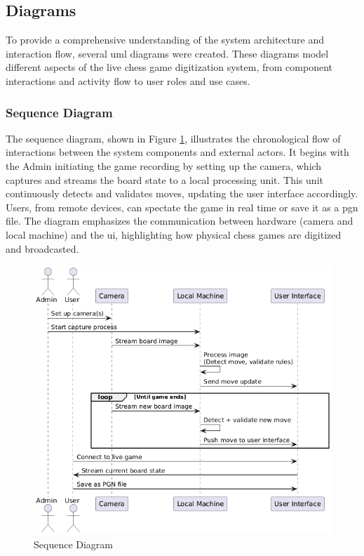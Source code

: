 \subsection{Diagrams}
\label{subsec:diagrams}

To provide a comprehensive understanding of the system architecture and interaction flow, several \gls{uml} diagrams were created. These diagrams model different aspects of the live chess game digitization system, from component interactions and activity flow to user roles and use cases.

\subsubsection*{Sequence Diagram}
\label{subsubsec:sequence-diagram}

The sequence diagram, shown in Figure \ref{fig:sequence}, illustrates the chronological flow of interactions between the system components and external actors. It begins with the Admin initiating the game recording by setting up the camera, which captures and streams the board state to a local processing unit. This unit continuously detects and validates moves, updating the user interface accordingly. Users, from remote devices, can spectate the game in real time or save it as a \gls{pgn} file. The diagram emphasizes the communication between hardware (camera and local machine) and the \gls{ui}, highlighting how physical chess games are digitized and broadcasted.

\begin{figure}[h!]
    \centering
    \includegraphics[width=0.75\linewidth]{figures/methods/uml/sequence.png}
    \caption[Sequence Diagram]{Sequence Diagram}
    \label{fig:sequence}
\end{figure}

